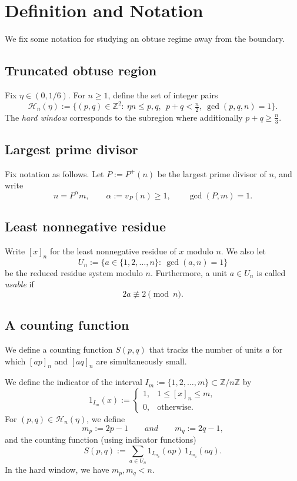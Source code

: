 \documentclass[12pt]{amsart}
\newcommand{\Z}{\mathbb{Z}}
\begin{document}
\section{Definition and Notation}
We fix some notation for studying an obtuse regime away from the boundary.

\subsection*{Truncated obtuse region}
Fix $\eta\in(0,1/6)$. For $n\ge 1$, define the set of integer pairs
\begin{equation}\label{eq:Hn}
\mathcal H_n(\eta):=\{(p,q)\in\mathbb Z^2:\ \eta n\le p,q,\ \ p+q<\tfrac{n}{2},\ \gcd(p,q,n)=1\}.
\end{equation}
The \emph{hard window} corresponds to the subregion where additionally $p+q\ge \tfrac{n}{3}$.

\subsection*{Largest prime divisor}
Fix notation as follows. Let $P:=P^+(n)$ be the largest prime divisor of $n$, and write
\[
n=P^{\alpha}m,\qquad \alpha:=v_P(n)\ge 1,\qquad \gcd(P,m)=1.
\]

\subsection*{Least nonnegative residue}
Write $[x]_n$ for the least nonnegative residue of $x$ modulo $n$.
We also let
\begin{equation}
U_n:=\{a\in\{1,2,\dots,n\}:\ \gcd(a,n)=1\}
\end{equation}
be the reduced residue system modulo $n$.
Furthermore, a unit $a\in U_n$ is called \emph{usable} if
\[
2a\not\equiv 2\pmod n.
\]


\subsection*{A counting function}

We define a counting function $S(p,q)$ that tracks the number of units $a$ for which $[ap]_n$ and $[aq]_n$ are simultaneously small.

We define the indicator of the interval $I_m:=\{1,2,\dots,m\}\subset\Z/n\Z$ by
\[
1_{I_m}(x):=
\begin{cases}
1,& 1\le [x]_n\le m,\\
0,& \text{otherwise.}
\end{cases}
\]
For $(p,q)\in\mathcal{H}_n(\eta)$, we define
\[
m_p:=2p-1\qquad and \qquad m_q:=2q-1,
\]
and the counting function (using indicator functions)
\begin{equation}
\label{eq:Sdef}
S(p,q):=\sum_{a\in U_n} 1_{I_{m_p}}(ap)\,1_{I_{m_q}}(aq).
\end{equation}
In the hard window, we have $m_p,m_q<n$.
\end{document}
